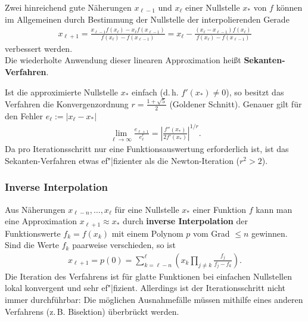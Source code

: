 Zwei hinreichend gute Näherungen $x_{\ell-1}$ und $x_\ell$ einer Nullstelle
$x_\ast$ von $f$ können im Allgemeinen durch Bestimmung der Nullstelle
der interpolierenden Gerade
\begin{align*}
    x_{\ell+1}
    = \frac{x_{\ell-1} f(x_\ell) - x_\ell f(x_{\ell-1})}
    {f(x_\ell) - f(x_{\ell-1})}
    = x_\ell - \frac{(x_\ell - x_{\ell-1}) f(x_\ell)}
    {f(x_\ell) - f(x_{\ell-1})}
\end{align*}
verbessert werden. \\
Die wiederholte Anwendung dieser linearen Approximation heißt
\textbf{Sekanten-Verfahren}.

Ist die approximierte Nullstelle $x_\ast$ einfach
(d.\,h. $f'(x_\ast) \not= 0$), so besitzt das Verfahren
die Konvergenzordnung $r = \frac{1 + \sqrt{5}}{2}$ (Goldener Schnitt).
Genauer gilt für den Fehler $e_\ell := |x_\ell - x_\ast|$
\begin{align*}
    \lim_{\ell \to \infty} \frac{e_{\ell+1}}{e_\ell^r}
    = \left|\frac{f''(x_\ast)}{2 f'(x_\ast)}\right|^{1/r}.
\end{align*}
Da pro Iterationsschritt nur eine Funktionsauswertung erforderlich ist,
ist das Sekanten-Verfah\-ren etwas ef"|fizienter als die Newton-Iteration
($r^2 > 2$).

\pagebreak

\subsubsection{%
    Inverse Interpolation%
}

Aus Näherungen $x_{\ell-n}, \dotsc, x_\ell$ für eine Nullstelle $x_\ast$
einer Funktion $f$ kann man eine Approximation $x_{\ell+1} \approx x_\ast$
durch \textbf{inverse Interpolation} der Funktionswerte $f_k = f(x_k)$
mit einem Polynom $p$ vom Grad $\le n$ gewinnen.
Sind die Werte $f_k$ paarweise verschieden, so ist
\begin{align*}
    x_{\ell+1} = p(0)
    = \sum_{k=\ell-n}^\ell \left(x_k
    \prod_{j\not=k} \frac{f_j}{f_j - f_k}\right).
\end{align*}
Die Iteration des Verfahrens ist für glatte Funktionen bei einfachen
Nullstellen lokal konvergent und sehr ef"|fizient.
Allerdings ist der Iterationsschritt nicht immer durchführbar:
Die möglichen Ausnahmefälle müssen mithilfe eines anderen Verfahrens
(z.\,B. Bisektion) überbrückt werden.

\linie

